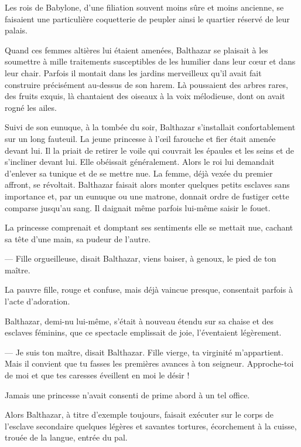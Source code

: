 \documentclass[a4paper, 11pt, oneside, polutonikogreek, french]{article}
\begin{document}
Les rois de Babylone, d'une filiation souvent moins sûre et moins ancienne, se faisaient une particulière coquetterie de peupler ainsi le quartier réservé de leur palais.

\bigskip
\centerline{\EightStarTaper}
\centerline{\EightStarTaper\EightStarTaper}
\bigskip

Quand ces femmes altières lui étaient amenées, Balthazar se plaisait à les soumettre à mille traitements susceptibles de les humilier dans leur cœur et dans leur chair. Parfois il montait dans les jardins merveilleux qu'il avait fait construire précisément au-dessus de son harem. Là poussaient des arbres rares, des fruits exquis, là chantaient des oiseaux à la voix mélodieuse, dont on avait rogné les ailes.

Suivi de son eunuque, à la tombée du soir, Balthazar s'installait confortablement sur un long fauteuil. La jeune princesse à l'œil farouche et fier était amenée devant lui. Il la priait de retirer le voile qui couvrait les épaules et les seins et de s'incliner devant lui. Elle obéissait généralement. Alors le roi lui demandait d'enlever sa tunique et de se mettre nue. La femme, déjà vexée du premier affront, se révoltait. Balthazar faisait alors monter quelques petits esclaves sans importance et, par un eunuque ou une matrone, donnait ordre de fustiger cette comparse jusqu'au sang. Il daignait même parfois lui-même saisir le fouet.

La princesse comprenait et domptant ses sentiments elle se mettait nue, cachant sa tête d'une main, sa pudeur de l'autre.

--- Fille orgueilleuse, disait Balthazar, viens baiser, à genoux, le pied de ton maître.

La pauvre fille, rouge et confuse, mais déjà vaincue presque, consentait parfois à l'acte d'adoration.

Balthazar, demi-nu lui-même, s'était à nouveau étendu sur sa chaise et des esclaves féminins, que ce spectacle emplissait de joie, l'éventaient légèrement.

--- Je suis ton maître, disait Balthazar. Fille vierge, ta virginité m'appartient. Mais il convient que tu fasses les premières avances à ton seigneur. Approche-toi de moi et que tes caresses éveillent en moi le désir !

Jamais une princesse n'avait consenti de prime abord à un tel office.

Alors Balthazar, à titre d'exemple toujours, faisait exécuter sur le corps de l'esclave secondaire quelques légères et savantes tortures, écorchement à la cuisse, trouée de la langue, entrée du pal.
\end{document}
